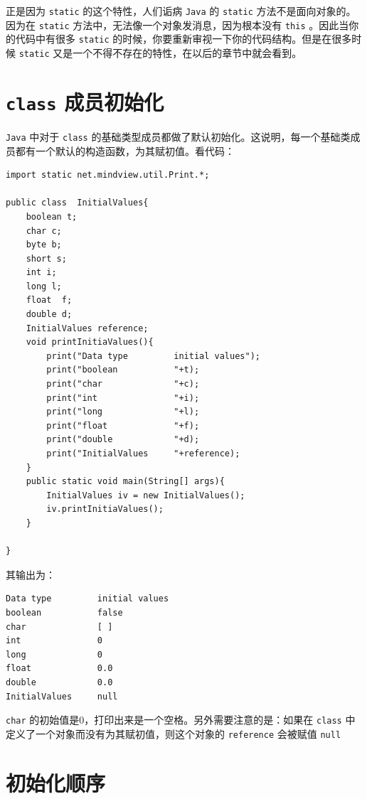 \documentclass[10pt,a4paper,UTF8]{article}
\begin{document}
正是因为 \texttt{static} 的这个特性，人们诟病 \texttt{Java} 的 \texttt{static} 方法不是面向对象的。因为在 \texttt{static} 方法中，无法像一个对象发消息，因为根本没有 \texttt{this} 。因此当你的代码中有很多 \texttt{static} 的时候，你要重新审视一下你的代码结构。但是在很多时候 \texttt{static} 又是一个不得不存在的特性，在以后的章节中就会看到。
\section{\texttt{class} 成员初始化}
\label{sec:org4136063}


\texttt{Java} 中对于 \texttt{class} 的基础类型成员都做了默认初始化。这说明，每一个基础类成员都有一个默认的构造函数，为其赋初值。看代码：
\lstset{language=java,label= ,caption= ,captionpos=b,firstnumber=1,numbers=left}
\begin{lstlisting}
import static net.mindview.util.Print.*;

public class  InitialValues{
    boolean t;
    char c;
    byte b;
    short s;
    int i;
    long l;
    float  f;
    double d;
    InitialValues reference;
    void printInitiaValues(){
        print("Data type         initial values");
        print("boolean           "+t);
        print("char              "+c);
        print("int               "+i);
        print("long              "+l);
        print("float             "+f);
        print("double            "+d);
        print("InitialValues     "+reference);
    }
    public static void main(String[] args){
        InitialValues iv = new InitialValues();
        iv.printInitiaValues();
    }

}
\end{lstlisting}
其输出为：
\begin{verbatim}
Data type         initial values
boolean           false
char              [ ]
int               0
long              0
float             0.0
double            0.0
InitialValues     null
\end{verbatim}
\texttt{char} 的初始值是0，打印出来是一个空格。另外需要注意的是：如果在 \texttt{class} 中定义了一个对象而没有为其赋初值，则这个对象的 \texttt{reference} 会被赋值 \texttt{null}
\section{初始化顺序}
\label{sec:org072a7b8}
\end{document}
